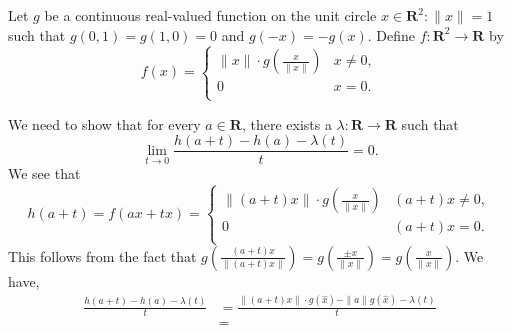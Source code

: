 Let $g$ be a continuous real-valued function on the unit
circle ${x\in \mathbf{R}^2:\|x\|=1}$ such that $g(0,1)
=g(1,0) =0$ and $g(-x)=-g(x)$. Define $f:\mathbf{R}^2
\to \mathbf{R}$ by
$$f(x)=
\begin{cases}
    \|x\|\cdot g\left(\frac{x}{\|x\|}\right) & x \neq 0,\\
    0 & x =0.\\        
\end{cases}$$
    
\begin{questions}

    \begin{solution}
        We need to show that for every $a\in \mathbf{R}$, there
        exists a $\lambda:\mathbf{R}\to\mathbf{R}$ such that
        \begin{equation}
            \lim_{t\to 0}{\frac{h(a+t)-h(a)-\lambda(t)}{t}} = 0.
        \end{equation}
        We see that
        $$h(a+t)=f(ax+tx)=
        \begin{cases}
            \|(a+t)x\|\cdot g\left(\frac{x}
            {\|x\|}\right) & (a+t)x\neq 0,\\
            0 & (a+t)x=0.\\
        \end{cases}$$
        This follows from the fact that $g\left(\frac{(a+t)x}
        {\|(a+t)x\|}\right)=g\left(\frac{\pm x}{\|x\|}\right)
        =g\left(\frac{x}{\|x\|}\right).$ We have,
        \begin{align*}
            \frac{h(a+t)-h(a)-\lambda(t)}{t} & =
            \frac{\|(a+t)x\|\cdot g(\hat{x})-\|a\|g(\hat{x})-\lambda(t)}
            {t}\\
            & = 
        \end{align*}
    \end{solution}
\end{questions}